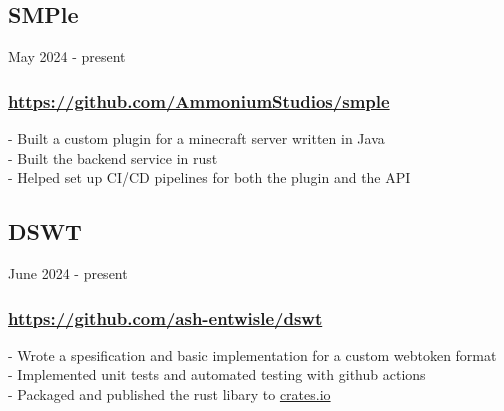 \subsection{SMPle} May 2024 - present \\
\subsubsection{\href{https://github.com/AmmoniumStudios/smple}{https://github.com/AmmoniumStudios/smple}}
-\:  Built a custom plugin for a minecraft server written in Java \\
-\:  Built the backend service in rust \\
-\:  Helped set up CI/CD pipelines for both the plugin and the API \\

\subsection{DSWT} June 2024 - present \\
\subsubsection{\href{https://github.com/ash-entwisle/dswt}{https://github.com/ash-entwisle/dswt} }
-\:  Wrote a spesification and basic implementation for a custom webtoken format \\
-\:  Implemented unit tests and automated testing with github actions \\
-\:  Packaged and published the rust libary to \href{https://crates.io/}{crates.io} \\ 
